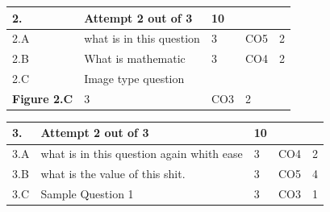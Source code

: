 \documentclass[12pt]{article}
\begin{document}
	\begin{longtable}{|L{1cm}|L{8cm}|C{1cm}|C{1cm}|C{1cm}|}\hline
	\bf2. & \bf{Attempt} \bf{2} \bf{out of} \bf{3} & \bf{10}  & & \\ \hline





		2.A &
	what is in this question \newline
			
	 &  3 & CO5 & 2\\ \hline
		2.B &
	What is mathematic \newline
			
	 &  3 & CO4 & 2\\ \hline
		2.C &
	Image type question \newline
			\begin{center}
		\includegraphics[width=4cm,height=3cm]{media/diagrams/2020/05/27/gameidea.png}\\\bf{Figure }\bf2.C		
	\end{center}
		
	 &  3 & CO3 & 2\\ \hline
	\end{longtable}


\begin{longtable}{|L{1cm}|L{8cm}|C{1cm}|C{1cm}|C{1cm}|}\hline
	\bf3. & \bf{Attempt} \bf{2} \bf{out of} \bf{3} & \bf{10}  & & \\ \hline





		3.A &
	what is in this question again whith ease \newline
			
	 &  3 & CO4 & 2\\ \hline
		3.B &
	what is the value of this shit. \newline
			
	 &  3 & CO5 & 4\\ \hline
		3.C &
	Sample Question 1 \newline
			
	 &  3 & CO3 & 1\\ \hline
	\end{longtable}
\end{document}
